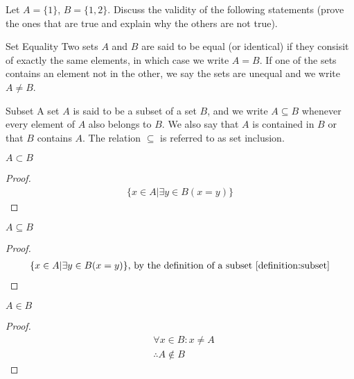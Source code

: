 \begin{question} Let $A = \{1\}$, $B = \{1, 2\}$. Discuss the validity of the following statements (prove the ones that are true and explain why the others are not true).
  \begin{definition}{Set Equality}
    \label{definition:set_equality}
    Two sets $A$ and $B$ are said to be equal (or identical) if they consisit of exactly the same elements, in which case we write $A = B$. If one of the sets contains an element not in the other, we say the sets are unequal and we write $A \neq B$.
  \end{definition}
  \begin{definition}{Subset}
    \label{definition:subset}
    A set $A$ is said to be a subset of a set $B$, and we write $A \subseteq B$ whenever every element of $A$ also belongs to $B$. We also say that $A$ is contained in $B$ or that $B$ contains $A$. The relation $\subseteq$ is referred to as set inclusion.
  \end{definition}

  \begin{subquestion}
    $A \subset B$
  \end{subquestion}
  \begin{proof}
    \begin{equation}
      \begin{split}
        \{ x \in A | \exists y \in B (x = y)\}
      \end{split}
    \end{equation}
  \end{proof}

  \begin{subquestion}
    $A \subseteq B$
  \end{subquestion}
  \begin{proof}
    \begin{equation}
      \begin{split}
        \{ x \in A | \exists y \in B (x = y)\} \text{, by the definition of a subset \ref{definition:subset}}
      \end{split}
    \end{equation}
  \end{proof}

  \begin{subquestion}
    $A \in B$
  \end{subquestion}
  \begin{proof}
    \begin{equation}
      \begin{split}
        & \forall x \in B: x \neq A \\
        & \therefore A \notin B
      \end{split}
    \end{equation}
  \end{proof}


\end{question}

